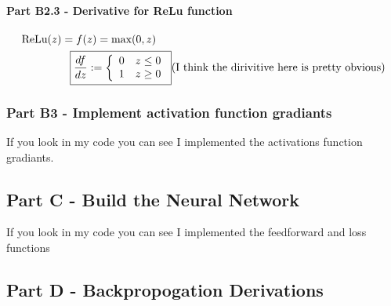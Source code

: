 \documentclass[]{article}
\begin{document}
\paragraph{Part B2.3 - Derivative for ReLu function}
\begin{align*} 
\text{ReLu}(z) = f(z)& = \text{max}(0,z)\\
\Aboxed{ \frac{df}{dz} : &= \left\{
    \begin{array}{ll}
      0 ~~~ z\leq 0 \\ 
      1 ~~~ z\geq 0 \\
    \end{array}
  \right. } \text{(I think the dirivitive here is pretty obvious)}\\
\end{align*}


\subsubsection{Part B3 - Implement activation function gradiants}
If you look in my code you can see I implemented the activations function gradiants. 

\subsection{Part C - Build the Neural Network}
If you look in my code you can see I implemented the feedforward and loss functions
\subsection{Part D - Backpropogation Derivations}
\end{document}
